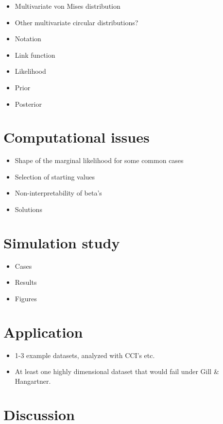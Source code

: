 \documentclass[12pt,a4paper]{article}
\begin{document}
\begin{itemize}
\item Multivariate von Mises distribution
\item Other multivariate circular distributions?
\item Notation
\item Link function
\item Likelihood
\item Prior
\item Posterior
\end{itemize}

\section{Computational issues}

\begin{itemize}
\item Shape of the marginal likelihood for some common cases
\item Selection of starting values
\item Non-interpretability of beta's
\item Solutions
\end{itemize}

\section{Simulation study}

\begin{itemize}
\item Cases
\item Results
\item Figures
\end{itemize}

\section{Application}

\begin{itemize}
\item 1-3 example datasets, analyzed with CCI's etc. 
\item At least one highly dimensional dataset that would fail under Gill \& Hangartner.  
\end{itemize}


\section{Discussion}
\end{document}
